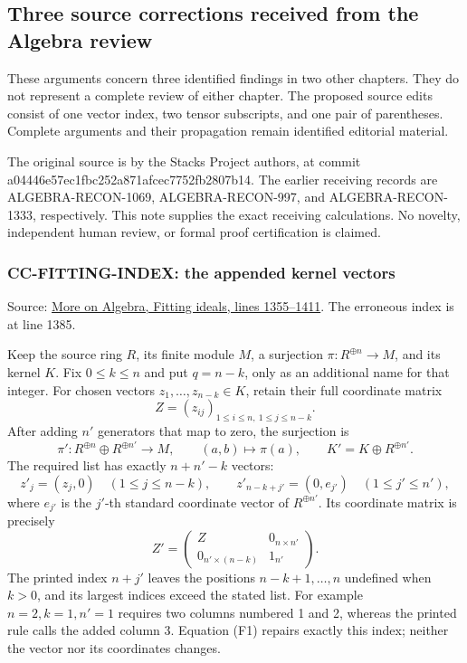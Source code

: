 \subsection{Three source corrections received from the Algebra review}\label{three-source-corrections-received-from-the-algebra-review}

These arguments concern three identified findings in two other chapters. They do not represent a complete review of either chapter. The proposed source edits consist of one vector index, two tensor subscripts, and one pair of parentheses. Complete arguments and their propagation remain identified editorial material.

The original source is by the Stacks Project authors, at commit a04446e57ec1fbc252a871afcec7752fb2807b14. The earlier receiving records are ALGEBRA-RECON-1069, ALGEBRA-RECON-997, and ALGEBRA-RECON-1333, respectively. This note supplies the exact receiving calculations. No novelty, independent human review, or formal proof certification is claimed.

\subsubsection{CC-FITTING-INDEX: the appended kernel vectors}\label{cc-fitting-index-the-appended-kernel-vectors}

Source: \href{https://github.com/stacks/stacks-project/blob/a04446e57ec1fbc252a871afcec7752fb2807b14/more-algebra.tex\#L1355}{More on Algebra, Fitting ideals, lines 1355--1411}. The erroneous index is at line 1385.

Keep the source ring \(R\), its finite module \(M\), a surjection \(\pi:R^{\oplus n}\to M\), and its kernel \(K\). Fix \(0\leq k\leq n\) and put \(q=n-k\), only as an additional name for that integer. For chosen vectors \(z_1,\ldots,z_{n-k}\in K\), retain their full coordinate matrix \[
 Z=(z_{ij})_{1\leq i\leq n,\ 1\leq j\leq n-k}.
\] After adding \(n'\) generators that map to zero, the surjection is \[
 \pi':R^{\oplus n}\oplus R^{\oplus n'}\longrightarrow M,
 \qquad (a,b)\longmapsto\pi(a),
 \qquad K'=K\oplus R^{\oplus n'}.
\] The required list has exactly \(n+n'-k\) vectors: \[
 z'_j=(z_j,0)\quad(1\leq j\leq n-k),\qquad
 z'_{n-k+j'}=(0,e_{j'})\quad(1\leq j'\leq n'),
\tag{F1}
\] where \(e_{j'}\) is the \(j'\)-th standard coordinate vector of \(R^{\oplus n'}\). Its coordinate matrix is precisely \[
 Z'=
 \begin{pmatrix}
  Z&0_{n\times n'}\\
  0_{n'\times(n-k)}&1_{n'}
 \end{pmatrix}.
\tag{F2}
\] The printed index \(n+j'\) leaves the positions \(n-k+1,\ldots,n\) undefined when \(k>0\), and its largest indices exceed the stated list. For example \(n=2,k=1,n'=1\) requires two columns numbered 1 and 2, whereas the printed rule calls the added column 3. Equation (F1) repairs exactly this index; neither the vector nor its coordinates changes.

